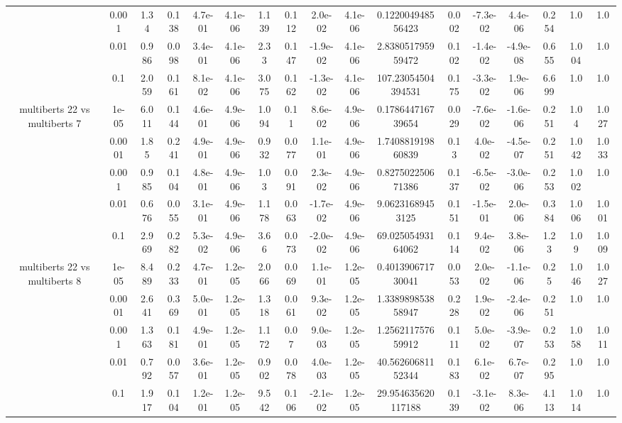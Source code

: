 \begin{tabular}{|c|c|c|c|c|c|c|c|c|c|c|c|c|c|c|c|c|}
 & 0.001 & 1.34 & 0.138 & 4.7e-01 & 4.1e-06 & 1.139 & 0.112 & 2.0e-02 & 4.1e-06 & 0.122004948556423 & 0.002 & -7.3e-02 & 4.4e-06 & 0.254 & 1.0 & 1.0 \\
 & 0.01 & 0.986 & 0.098 & 3.4e-01 & 4.1e-06 & 2.33 & 0.147 & -1.9e-02 & 4.1e-06 & 2.838051795959472 & 0.102 & -1.4e-02 & -4.9e-08 & 0.655 & 1.004 & 1.0 \\
 & 0.1 & 2.059 & 0.161 & 8.1e-02 & 4.1e-06 & 3.075 & 0.162 & -1.3e-02 & 4.1e-06 & 107.23054504394531 & 0.175 & -3.3e-02 & 1.9e-06 & 6.699 & 1.0 & 1.0 \\
\hline
\multirow{5}{*}{multiberts 22 vs multiberts 7} & 1e-05 & 6.011 & 0.144 & 4.6e-01 & 4.9e-06 & 1.094 & 0.11 & 8.6e-02 & 4.9e-06 & 0.178644716739654 & 0.029 & -7.6e-02 & -1.6e-06 & 0.251 & 1.04 & 1.027 \\
 & 0.0001 & 1.85 & 0.241 & 4.9e-01 & 4.9e-06 & 0.932 & 0.077 & 1.1e-01 & 4.9e-06 & 1.740881919860839 & 0.13 & 4.0e-02 & -4.5e-07 & 0.251 & 1.042 & 1.033 \\
 & 0.001 & 0.985 & 0.104 & 4.8e-01 & 4.9e-06 & 1.03 & 0.091 & 2.3e-02 & 4.9e-06 & 0.827502250671386 & 0.137 & -6.5e-02 & -3.0e-06 & 0.253 & 1.002 & 1.0 \\
 & 0.01 & 0.676 & 0.055 & 3.1e-01 & 4.9e-06 & 1.178 & 0.063 & -1.7e-02 & 4.9e-06 & 9.06231689453125 & 0.151 & -1.5e-01 & 2.0e-06 & 0.384 & 1.006 & 1.001 \\
 & 0.1 & 2.969 & 0.282 & 5.3e-02 & 4.9e-06 & 3.66 & 0.073 & -2.0e-02 & 4.9e-06 & 69.02505493164062 & 0.114 & 9.4e-02 & 3.8e-06 & 1.23 & 1.09 & 1.009 \\
\hline
\multirow{5}{*}{multiberts 22 vs multiberts 8} & 1e-05 & 8.489 & 0.233 & 4.7e-01 & 1.2e-05 & 2.066 & 0.069 & 1.1e-01 & 1.2e-05 & 0.401390671730041 & 0.053 & 2.0e-02 & -1.1e-06 & 0.25 & 1.046 & 1.027 \\
 & 0.0001 & 2.641 & 0.369 & 5.0e-01 & 1.2e-05 & 1.318 & 0.061 & 9.3e-02 & 1.2e-05 & 1.338989853858947 & 0.228 & 1.9e-02 & -2.4e-06 & 0.251 & 1.0 & 1.0 \\
 & 0.001 & 1.363 & 0.181 & 4.9e-01 & 1.2e-05 & 1.172 & 0.07 & 9.0e-03 & 1.2e-05 & 1.256211757659912 & 0.111 & 5.0e-02 & -3.9e-07 & 0.253 & 1.058 & 1.011 \\
 & 0.01 & 0.792 & 0.057 & 3.6e-01 & 1.2e-05 & 0.902 & 0.078 & 4.0e-03 & 1.2e-05 & 40.56260681152344 & 0.183 & 6.1e-02 & 6.7e-07 & 0.295 & 1.0 & 1.0 \\
 & 0.1 & 1.917 & 0.104 & 1.2e-01 & 1.2e-05 & 9.542 & 0.106 & -2.1e-02 & 1.2e-05 & 29.954635620117188 & 0.139 & -3.1e-02 & 8.3e-06 & 4.113 & 1.014 & 1.0 \\

\end{tabular}
